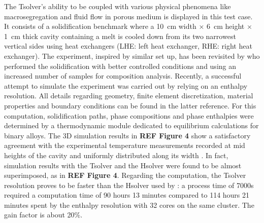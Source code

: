 The Tsolver’s ability to be coupled with various physical phenomena like macrosegregation and fluid flow 
in porous medium is displayed in this test case. It consists of a solidification benchmark where a \SI{10}{\centi \metre}
width $\times$ \SI{6}{\centi \metre} height $\times$ \SI{1}{\centi \metre} thick cavity containing 
a  melt is cooled down from its two 
narrowest vertical sides using heat exchangers (LHE: left heat exchanger, RHE: right heat exchanger). The 
experiment, inspired by \citet{hebditch_observations_1974} similar set up, has been 
revisited by \citet{hachani_experimental_2012} who performed the solidification with better 
controlled conditions and using an increased number of samples for composition analysis. Recently, a successful 
attempt to simulate the experiment was carried out by \citet{carozzani_direct_2013} relying on an enthalpy resolution. 
All details regarding geometry, finite element discretization, material properties 
and boundary conditions can be found in the latter reference. 
For this computation, solidification paths, phase compositions and phase enthalpies were determined by a thermodynamic 
module dedicated to equilibrium calculations for binary alloys. The 3D simulation results in \textbf{REF Figure 4} show 
a satisfactory agreement with the experimental temperature measurements recorded at mid heights of the cavity and uniformly 
distributed along its width \citep{carozzani_direct_2013}. In fact, simulation results with the Tsolver and the Hsolver were 
found to be almost superimposed, as in \textbf{REF Figure 4}. Regarding the computation, the Tsolver resolution proves to be 
faster than the Hsolver used by \citet{carozzani_direct_2013}: a process time of 7000s required a computation time of 90 hours 
13 minutes compared to 114 hours 21 minutes spent by the enthalpy resolution with 32 cores on the same cluster. The gain factor 
is about 20\%.
